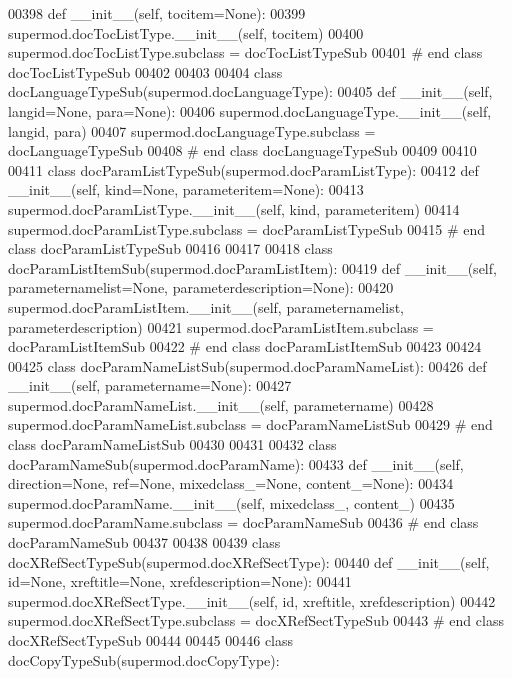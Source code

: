 \begin{DoxyCode}
00398     \textcolor{keyword}{def }__init__(self, tocitem=None):
00399         supermod.docTocListType.\_\_init\_\_(self, tocitem)
00400 supermod.docTocListType.subclass = docTocListTypeSub
00401 \textcolor{comment}{# end class docTocListTypeSub}
00402 
00403 
00404 \textcolor{keyword}{class }docLanguageTypeSub(supermod.docLanguageType):
00405     \textcolor{keyword}{def }__init__(self, langid=None, para=None):
00406         supermod.docLanguageType.\_\_init\_\_(self, langid, para)
00407 supermod.docLanguageType.subclass = docLanguageTypeSub
00408 \textcolor{comment}{# end class docLanguageTypeSub}
00409 
00410 
00411 \textcolor{keyword}{class }docParamListTypeSub(supermod.docParamListType):
00412     \textcolor{keyword}{def }__init__(self, kind=None, parameteritem=None):
00413         supermod.docParamListType.\_\_init\_\_(self, kind, parameteritem)
00414 supermod.docParamListType.subclass = docParamListTypeSub
00415 \textcolor{comment}{# end class docParamListTypeSub}
00416 
00417 
00418 \textcolor{keyword}{class }docParamListItemSub(supermod.docParamListItem):
00419     \textcolor{keyword}{def }__init__(self, parameternamelist=None, parameterdescription=None):
00420         supermod.docParamListItem.\_\_init\_\_(self, parameternamelist, parameterdescription)
00421 supermod.docParamListItem.subclass = docParamListItemSub
00422 \textcolor{comment}{# end class docParamListItemSub}
00423 
00424 
00425 \textcolor{keyword}{class }docParamNameListSub(supermod.docParamNameList):
00426     \textcolor{keyword}{def }__init__(self, parametername=None):
00427         supermod.docParamNameList.\_\_init\_\_(self, parametername)
00428 supermod.docParamNameList.subclass = docParamNameListSub
00429 \textcolor{comment}{# end class docParamNameListSub}
00430 
00431 
00432 \textcolor{keyword}{class }docParamNameSub(supermod.docParamName):
00433     \textcolor{keyword}{def }__init__(self, direction=None, ref=None, mixedclass\_=None, content\_=None):
00434         supermod.docParamName.\_\_init\_\_(self, mixedclass\_, content\_)
00435 supermod.docParamName.subclass = docParamNameSub
00436 \textcolor{comment}{# end class docParamNameSub}
00437 
00438 
00439 \textcolor{keyword}{class }docXRefSectTypeSub(supermod.docXRefSectType):
00440     \textcolor{keyword}{def }__init__(self, id=None, xreftitle=None, xrefdescription=None):
00441         supermod.docXRefSectType.\_\_init\_\_(self, id, xreftitle, xrefdescription)
00442 supermod.docXRefSectType.subclass = docXRefSectTypeSub
00443 \textcolor{comment}{# end class docXRefSectTypeSub}
00444 
00445 
00446 \textcolor{keyword}{class }docCopyTypeSub(supermod.docCopyType):

\end{DoxyCode}
